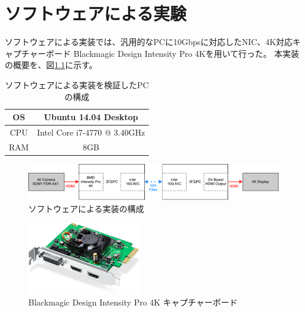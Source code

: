 \chapter{ソフトウェアによる実験}
\label{chap:software-experimentation}

ソフトウェアによる実装では、汎用的なPCに10Gbpsに対応したNIC、4K対応キャプチャーボード Blackmagic Design Intensity Pro 4Kを用いて行った。
本実装の概要を、図\ref{fig:software-implement-flow}に示す。

\begin{table}[htbp]
  \caption{ソフトウェアによる実装を検証したPCの構成}
  \label{tb:software-specification}
  \begin{center}
  \begin{tabular}{c||c}
    \hline
    OS  & Ubuntu 14.04 Desktop \\\hline
    CPU & Intel Core i7-4770 @ 3.40GHz \\\hline
    RAM & 8GB                  \\\hline
  \end{tabular}\end{center}
\end{table}

\begin{figure}[htbp]
  \begin{center}
    \includegraphics[bb=0 0 841 121,width=15.5cm]{img/software-implement-flow.pdf}
  \end{center}
  \caption{ソフトウェアによる実装の構成}
  \label{fig:software-implement-flow}
\end{figure}

\begin{figure}[htbp]
  \begin{center}
    \includegraphics[bb=0 0 644 410,width=5cm]{img/bmd-intensity-pro-4k.jpg}
  \end{center}
  \caption{Blackmagic Design Intensity Pro 4K キャプチャーボード}
  \label{fig:ted-4k-fmc-card}
\end{figure}

